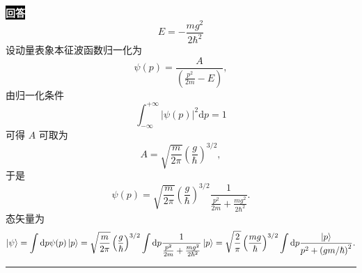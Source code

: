 \documentclass[11pt,a4paper]{ctexart}
\newenvironment{answer}
  {\par\smallskip\noindent
   \begingroup
   \setlength{\fboxsep}{4pt}%
   \colorbox{black}{\textcolor{white}{\bfseries 回答}}%
   \endgroup
   \quad\ignorespaces}
  {\par\smallskip\noindent\rule{\linewidth}{0.4pt}\medskip}
\begin{document}
\begin{answer}
\begin{equation}
    E
    =-\frac{mg^2 }{2\hbar^2 } 
  \end{equation}
  设动量表象本征波函数归一化为
  \begin{equation}
    \psi(p)
    =\frac{A }{\left(\frac{p^2 }{2m }-E  \right) },
  \end{equation}
  由归一化条件
  \begin{equation}
    \int_{-\infty}^{+\infty} \left|\psi(p) \right|^2\mathrm{d}p
    =1
  \end{equation}
  可得 $A $ 可取为
  \begin{equation}
    A
    =\sqrt{\frac{m }{2\pi } } \left(\frac{g }{\hbar }  \right)^{3/2},
  \end{equation}
  于是
  \begin{equation}
    \psi(p)
    =\sqrt{\frac{m }{2\pi } } \left(\frac{g }{\hbar }  \right)^{3/2} \frac{1 }{\frac{p^2 }{2m } + \frac{mg^2 }{2\hbar^2 }   }.
  \end{equation}
  态矢量为
  \begin{equation}
    \Ket{\psi }
    =\int \mathrm{d}p \psi(p) \Ket{p }
    =\sqrt{\frac{m }{2\pi } } \left(\frac{g }{\hbar }  \right)^{3/2} \int \mathrm{d}p \frac{1 }{\frac{p^2 }{2m } + \frac{mg^2 }{2\hbar^2 }   } \Ket{p }
    =\sqrt{\frac{2 }{\pi } } \left(\frac{mg }{\hbar }  \right)^{3/2} \int \mathrm{d}p \frac{\Ket{p } }{p^2+\left(gm/\hbar \right)^2 }. 
  \end{equation}
\end{answer}
\end{document}
